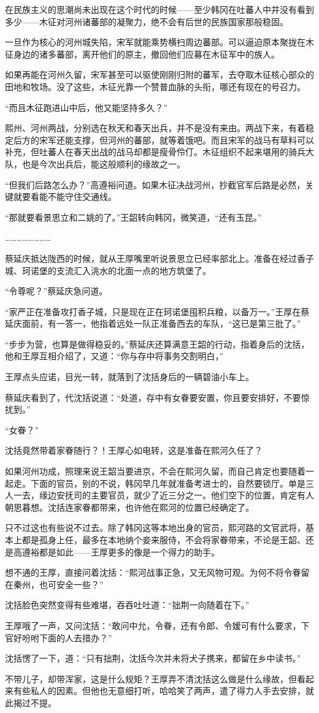 在民族主义的思潮尚未出现在这个时代的时候——至少韩冈在吐蕃人中并没有看到多少——木征对河州诸蕃部的凝聚力，绝不会有后世的民族国家那般稳固。

一旦作为核心的河州城失陷，宋军就能乘势横扫周边蕃部。可以逼迫原本聚拢在木征身边的诸多蕃部，离开他们的原主，撤回他们应募在木征军中的族人。

如果再能在河州久留，宋军甚至可以驱使刚刚归附的蕃军，去夺取木征核心部众的田地和牧场。没了这些，木征光靠一个赞普血脉的头衔，哪还有现在的号召力。

“而且木征跑进山中后，他又能坚持多久？”

熙州、河州两战，分别选在秋天和春天出兵，并不是没有来由。两战下来，有着稳定后方的宋军还能支撑，但河州的蕃部，就等着饿吧。而且宋军的战马有草料可以补充，但吐蕃人在春天出战的战马却都是瘦骨伶仃。木征组织不起来堪用的骑兵大队，也是今次出兵后，能这般顺利的缘故之一。

“但我们后路怎么办？”高遵裕问道。如果木征决战河州，抄截官军后路是必然，关键就要看能不能守住交通线。

“那就要看景思立和二姚的了。”王韶转向韩冈，微笑道，“还有玉昆。”

……………………

蔡延庆抵达陇西的时候，就从王厚嘴里听说景思立已经率部北上。准备在经过香子城、珂诺堡的支流汇入洮水的北面一点的地方筑堡了。

“令尊呢？”蔡延庆急问道。

“家严正在准备攻打香子城，只是现在正在珂诺堡囤积兵粮，以备万一。”王厚在蔡延庆面前，有一答一，他指着远处一队正准备西去的车队，“这已是第三批了。”

“步步为营，也算是做得稳妥的。”蔡延庆还算满意王韶的行动，指着身后的沈括，他和王厚互相介绍了，又道：“你与存中将事务交割明白，”

王厚点头应诺，目光一转，就落到了沈括身后的一辆碧油小车上。

蔡延庆看到了，代沈括说道：“处道，存中有女眷要安置，你且要安排好，不要惊扰到。”

“女眷？”

沈括竟然带着家眷随行？！王厚心如电转，这是准备在熙河久任了？

如果河州功成，照理来说王韶当要进京，不会在熙河久留，而自己肯定也要随着一起走。下面的官员，别的不说，韩冈早几年就准备考进士的，自然要锁厅。单是三人一去，缘边安抚司的主要官员，就少了近三分之一。他们空下的位置，肯定有人朝思暮想。沈括连家眷都带来，也许他在熙河的位置已经确定了。

只不过这也有些说不过去。除了韩冈这等本地出身的官员，熙河路的文官武将，基本上都是孤身上任，最多在本地纳个妾来服侍，不会将家眷带来，不论是王韶、还是高遵裕都是如此——王厚更多的像是一个得力的助手。

想不通的王厚，直接问着沈括：“熙河战事正急，又无风物可观。为何不将令眷留在秦州，也可安全一些？”

沈括脸色突然变得有些难堪，吞吞吐吐道：“拙荆一向随着在下。”

王厚哦了一声，又问沈括：“敢问中允，令眷，还有令郎、令嫒可有什么要求，下官好吩咐下面的人去措办？”

沈括愣了一下，道：“只有拙荆，沈括今次并未将犬子携来，都留在乡中读书。”

不带儿子，却带浑家，这是什么规矩？王厚弄不清沈括这么做是什么缘故，但看起来有些私人的因素。但他也无意细打听，哈哈笑了两声，遣了得力人手去安排，就此揭过不提。

